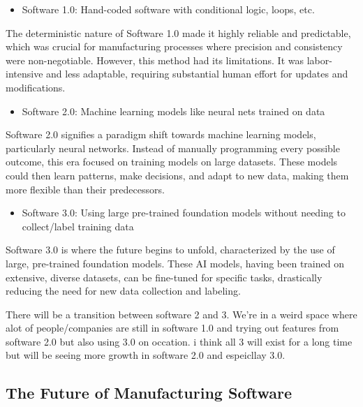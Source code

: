 \documentclass[
  letterpaper,
  DIV=11,
  numbers=noendperiod]{scrartcl}
\providecommand{\tightlist}{%
  \setlength{\itemsep}{0pt}\setlength{\parskip}{0pt}}\usepackage{longtable,booktabs,array}
\begin{document}
\begin{itemize}
\tightlist
\item
  Software 1.0: Hand-coded software with conditional logic, loops, etc.
\end{itemize}

The deterministic nature of Software 1.0 made it highly reliable and
predictable, which was crucial for manufacturing processes where
precision and consistency were non-negotiable. However, this method had
its limitations. It was labor-intensive and less adaptable, requiring
substantial human effort for updates and modifications.

\begin{itemize}
\tightlist
\item
  Software 2.0: Machine learning models like neural nets trained on data
\end{itemize}

Software 2.0 signifies a paradigm shift towards machine learning models,
particularly neural networks. Instead of manually programming every
possible outcome, this era focused on training models on large datasets.
These models could then learn patterns, make decisions, and adapt to new
data, making them more flexible than their predecessors.

\begin{itemize}
\tightlist
\item
  Software 3.0: Using large pre-trained foundation models without
  needing to collect/label training data
\end{itemize}

Software 3.0 is where the future begins to unfold, characterized by the
use of large, pre-trained foundation models. These AI models, having
been trained on extensive, diverse datasets, can be fine-tuned for
specific tasks, drastically reducing the need for new data collection
and labeling.

There will be a transition between software 2 and 3. We're in a weird
space where alot of people/companies are still in software 1.0 and
trying out features from software 2.0 but also using 3.0 on occation. i
think all 3 will exist for a long time but will be seeing more growth in
software 2.0 and espeicllay 3.0.

\hypertarget{the-future-of-manufacturing-software}{%
\subsection{The Future of Manufacturing
Software}\label{the-future-of-manufacturing-software}}
\end{document}
